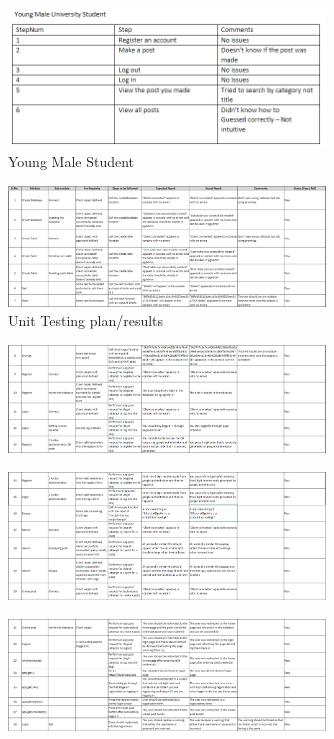 \documentclass{cmpstyle}
\begin{document}
\begin{figure}[htb]
	\centering
	\includegraphics[width=0.75\textwidth]{Young male.png}
	\caption{Young Male Student \label{YMale}}
\end{figure}
\begin{figure}[htb]
	\centering
	\caption{Unit Testing plan/results \label{Testing}}
	\includegraphics[width=0.75\textwidth]{Testing1.png}
\end{figure}
\begin{figure}[htb]
	\centering
	\includegraphics[width=0.75\textwidth]{Testing2.png}
\end{figure}
\begin{figure}[htb]
	\centering
	\includegraphics[width=0.75\textwidth]{Testing3.png}
\end{figure}
\begin{figure}[htb]
	\centering
	\includegraphics[width=0.75\textwidth]{Testing4.png}
\end{figure}
\end{document}
